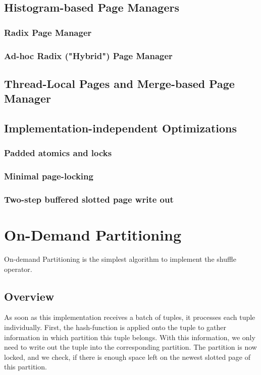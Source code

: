 \subsection{Histogram-based Page Managers}
\subsubsection{Radix Page Manager}
\subsubsection{Ad-hoc Radix ("Hybrid") Page Manager}

\subsection{Thread-Local Pages and Merge-based Page Manager}

\subsection{Implementation-independent Optimizations}
\subsubsection{Padded atomics and locks}
\subsubsection{Minimal page-locking}
\subsubsection{Two-step buffered slotted page write out}

\section{On-Demand Partitioning}
On-demand Partitioning is the simplest algorithm to implement the shuffle operator.
\subsection{Overview}
As soon as this implementation receives a batch of tuples, it processes each tuple individually.
First, the hash-function is applied onto the tuple to gather information in which partition this tuple belongs.
With this information, we only need to write out the tuple into the corresponding partition.
The partition is now locked, and we check, if there is enough space left on the newest slotted page of this partition.


